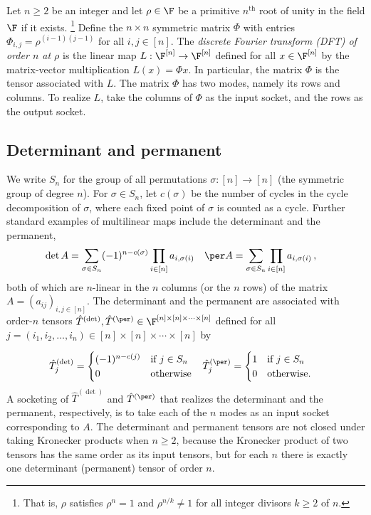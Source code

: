 Let $n\geq 2$ be an integer and let $\rho\in\F$ be a primitive
$n^\text{th}$ root of unity in the field $\F$ if it exists.%
\footnote{That is, $\rho$ satisfies $\rho^n=1$ and $\rho^{n/k}\neq 1$
for all integer divisors $k\geq 2$ of $n$.}{}
Define the $n\times n$ symmetric matrix $\Phi$ with
entries $\Phi_{i,j}=\rho^{(i-1)(j-1)}$ for all $i,j\in [n]$.
The \emph{discrete Fourier transform (DFT) of order $n$ at $\rho$} is the
linear map $L:\F^{[n]}\rightarrow \F^{[n]}$ defined for all $x\in\F^{[n]}$
by the matrix-vector multiplication $L(x)=\Phi x$.
In particular, the matrix $\Phi$ is the tensor
associated with $L$. The matrix $\Phi$ has two modes,
namely its rows and columns.
To realize $L$, take the columns of $\Phi$ as the input socket, and the rows
as the output socket.

\subsection{Determinant and permanent}

%
%
We   %
write $S_n$ for the %
%
group of all permutations
$\sigma:[n]\rightarrow [n]$
(the symmetric group of degree $n$).  %
For $\sigma \in S_n$, let $c(\sigma)$ be the number of
cycles in the cycle decomposition of $\sigma$,
where each fixed point of $\sigma$ is counted as a cycle.
Further standard examples of multilinear %
%
%
maps
%
include the determinant and
the  %
permanent,  %
\begin{align}
\label{eq:det and per}
\det A &=
\sum_{\sigma\in S_n}(-1)^{n-c(\sigma)}\prod_{i\in[n]}a_{i,\sigma(i)} &
\per A &=
\sum_{\sigma\in S_n}\prod_{i\in[n]}a_{i,\sigma(i)}\,,
\end{align}
both of which are $n$-linear in the $n$ columns (or the $n$ rows) of the
matrix $A=(a_{ij})_{i,j\in[n]}$.
The determinant and 
the  %
permanent are associated with order-$n$  %
tensors
$\hat{T}^{(\det)}, \hat{T}^{(\per)} \in \F^{[n] \times [n] \times \cdots \times [n]}$
defined for all $j = (i_1,i_2,\ldots,i_n) \in [n] \times [n] \times \cdots \times [n]$ by

\begin{align}
\label{tensor:det}
\hat{T}^{(\det)}_{j}&=
\begin{cases}
(-1)^{n-c(j)} & \text{if } j \in S_n\\
0 & \text{otherwise}
\end{cases} &
\hat{T}^{(\per)}_{j}&=
\begin{cases}
1 & \text{if } j \in S_n\\
0 & \text{otherwise}.
\end{cases}
\end{align}
A socketing of $\hat{T}^{(\det)}$ and $\hat{T}^{(\per)}$ that realizes the determinant and
the  %
permanent, respectively, is to take each of the $n$ modes as an input socket corresponding to $A$.
%
The determinant and permanent tensors are not closed under taking Kronecker products when $n \geq 2$, because the Kronecker product of two tensors has the same order as its input tensors, 
%
%
%
but for each $n$ there is exactly one determinant (permanent) tensor of order $n$.

